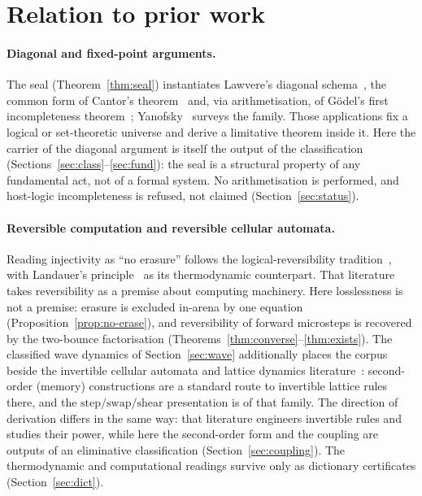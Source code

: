 \documentclass[11pt,a4paper]{article}
\theoremstyle{plain}
\theoremstyle{definition}
\theoremstyle{remark}
\begin{document}
\section{Relation to prior work}
\label{sec:related}

\paragraph{Diagonal and fixed-point arguments.}
The seal (Theorem~\ref{thm:seal}) instantiates Lawvere's diagonal
schema~\cite{lawvere}, the common form of Cantor's
theorem~\cite{cantor} and, via arithmetisation, of G\"odel's first
incompleteness theorem~\cite{godel}; Yanofsky~\cite{yanofsky} surveys
the family. Those applications fix a logical or set-theoretic universe
and derive a limitative theorem inside it. Here the carrier of the
diagonal argument is itself the output of the classification
(Sections~\ref{sec:class}--\ref{sec:fund}): the seal is a structural
property of any fundamental act, not of a formal system. No
arithmetisation is performed, and host-logic incompleteness is refused,
not claimed (Section~\ref{sec:status}).

\paragraph{Reversible computation and reversible cellular automata.}
Reading injectivity as ``no erasure'' follows the logical-reversibility
tradition~\cite{bennett,fredkintoffoli}, with Landauer's
principle~\cite{landauer} as its thermodynamic counterpart. That
literature takes reversibility as a premise about computing machinery.
Here losslessness is not a premise: erasure is excluded in-arena by one
equation (Proposition~\ref{prop:no-erase}), and reversibility of
forward microsteps is recovered by the two-bounce factorisation
(Theorems~\ref{thm:converse}--\ref{thm:exists}). The classified wave
dynamics of Section~\ref{sec:wave} additionally places the corpus
beside the invertible cellular automata and lattice dynamics
literature~\cite{toffolimargolus,margolus,kari}: second-order
(memory) constructions are a standard route to invertible lattice
rules there, and the $\mathrm{step}/\mathrm{swap}/\mathrm{shear}$
presentation is of that family. The direction of derivation differs
in the same way: that literature engineers invertible rules and
studies their power, while here the second-order form and the
coupling are outputs of an eliminative classification
(Section~\ref{sec:coupling}). The thermodynamic and computational
readings survive only as dictionary certificates
(Section~\ref{sec:dict}).
\end{document}
